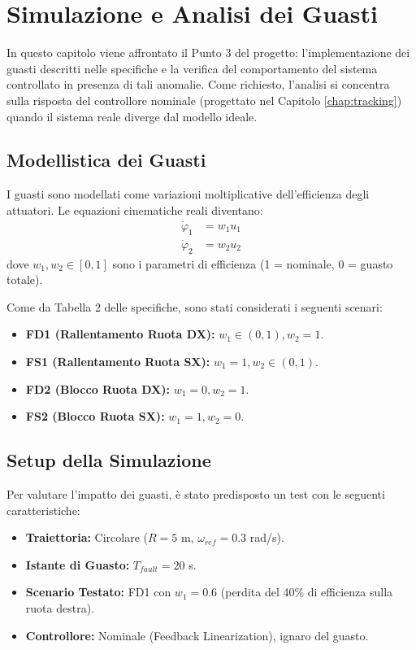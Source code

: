 \chapter{Simulazione e Analisi dei Guasti} \label{chap:guasti}

In questo capitolo viene affrontato il Punto 3 del progetto: l'implementazione dei guasti descritti nelle specifiche e la verifica del comportamento del sistema controllato in presenza di tali anomalie. Come richiesto, l'analisi si concentra sulla risposta del controllore nominale (progettato nel Capitolo \ref{chap:tracking}) quando il sistema reale diverge dal modello ideale.

\section{Modellistica dei Guasti}
I guasti sono modellati come variazioni moltiplicative dell'efficienza degli attuatori. Le equazioni cinematiche reali diventano:
\begin{align}
    \dot{\varphi}_1 &= w_1 u_1 \\
    \dot{\varphi}_2 &= w_2 u_2
\end{align}
dove \( w_1, w_2 \in [0, 1] \) sono i parametri di efficienza (1 = nominale, 0 = guasto totale).

Come da Tabella 2 delle specifiche, sono stati considerati i seguenti scenari:
\begin{itemize}
    \item \textbf{FD1 (Rallentamento Ruota DX):} \( w_1 \in (0,1), w_2=1 \).
    \item \textbf{FS1 (Rallentamento Ruota SX):} \( w_1=1, w_2 \in (0,1) \).
    \item \textbf{FD2 (Blocco Ruota DX):} \( w_1=0, w_2=1 \).
    \item \textbf{FS2 (Blocco Ruota SX):} \( w_1=1, w_2=0 \).
\end{itemize}

\section{Setup della Simulazione}
Per valutare l'impatto dei guasti, è stato predisposto un test con le seguenti caratteristiche:
\begin{itemize}
    \item \textbf{Traiettoria:} Circolare (\( R=5 \) m, \( \omega_{ref}=0.3 \) rad/s).
    \item \textbf{Istante di Guasto:} \( T_{fault} = 20 \) s.
    \item \textbf{Scenario Testato:} FD1 con \( w_1 = 0.6 \) (perdita del 40\% di efficienza sulla ruota destra).
    \item \textbf{Controllore:} Nominale (Feedback Linearization), ignaro del guasto.
\end{itemize}

